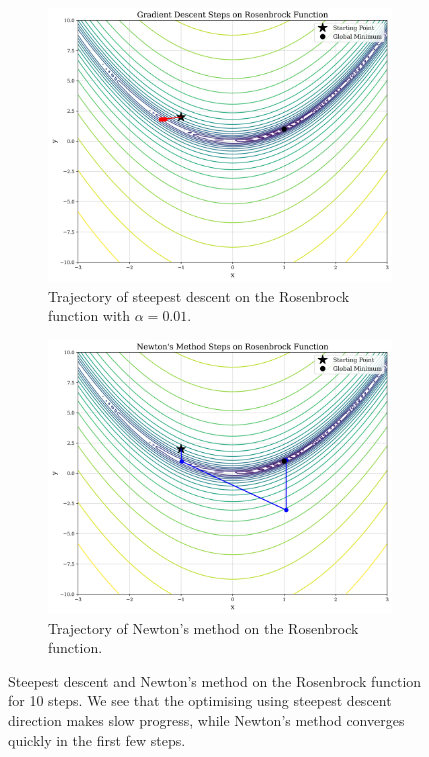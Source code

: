 \begin{figure}[h]
    \begin{subfigure}[b]{0.48\linewidth}
        \centering
        \includegraphics[width=\linewidth]{figures/2background/rosenbrock_gd.png}
        \caption{Trajectory of steepest descent on the Rosenbrock function with $\alpha = 0.01$.}
        \label{fig:rosenbrock_gd}
    \end{subfigure}
    \hfill
    \begin{subfigure}[b]{0.48\linewidth}
        \centering
        \includegraphics[width=\linewidth]{figures/2background/rosenbrock_newton.png}
        \caption{Trajectory of Newton's method on the Rosenbrock function.}
        \label{fig:rosenbrock_newton}
    \end{subfigure}
    \caption{Steepest descent and Newton's method on the Rosenbrock function for 10 steps. We see that the optimising using steepest descent direction makes slow progress, while Newton's method converges quickly in the first few steps.}
    \label{fig:scale_invariance}
\end{figure}

